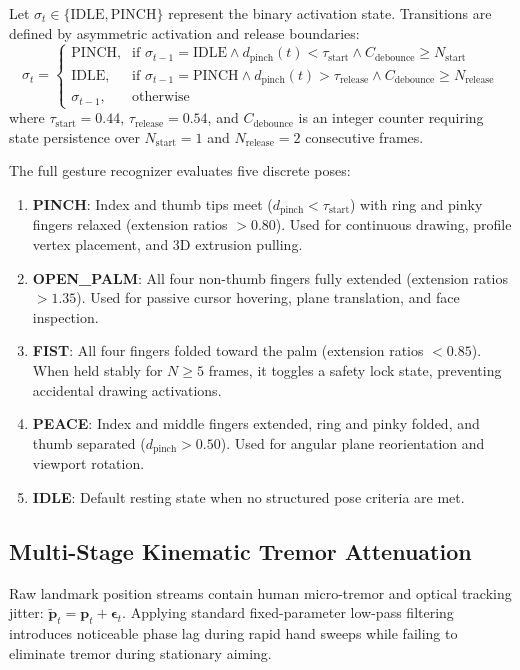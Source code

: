 Let $\sigma_t \in \{\text{IDLE}, \text{PINCH}\}$ represent the binary activation state. Transitions are defined by asymmetric activation and release boundaries:
\begin{equation}
\sigma_t = \begin{cases}
\text{PINCH}, & \text{if } \sigma_{t-1} = \text{IDLE} \land d_{\text{pinch}}(t) < \tau_{\text{start}} \land C_{\text{debounce}} \ge N_{\text{start}} \\
\text{IDLE}, & \text{if } \sigma_{t-1} = \text{PINCH} \land d_{\text{pinch}}(t) > \tau_{\text{release}} \land C_{\text{debounce}} \ge N_{\text{release}} \\
\sigma_{t-1}, & \text{otherwise}
\end{cases}
\label{eq:hysteresis}
\end{equation}
where $\tau_{\text{start}} = 0.44$, $\tau_{\text{release}} = 0.54$, and $C_{\text{debounce}}$ is an integer counter requiring state persistence over $N_{\text{start}} = 1$ and $N_{\text{release}} = 2$ consecutive frames.

The full gesture recognizer evaluates five discrete poses:
\begin{enumerate}
    \item \textbf{PINCH}: Index and thumb tips meet ($d_{\text{pinch}} < \tau_{\text{start}}$) with ring and pinky fingers relaxed (extension ratios $> 0.80$). Used for continuous drawing, profile vertex placement, and 3D extrusion pulling.
    \item \textbf{OPEN\_PALM}: All four non-thumb fingers fully extended (extension ratios $> 1.35$). Used for passive cursor hovering, plane translation, and face inspection.
    \item \textbf{FIST}: All four fingers folded toward the palm (extension ratios $< 0.85$). When held stably for $N \ge 5$ frames, it toggles a safety lock state, preventing accidental drawing activations.
    \item \textbf{PEACE}: Index and middle fingers extended, ring and pinky folded, and thumb separated ($d_{\text{pinch}} > 0.50$). Used for angular plane reorientation and viewport rotation.
    \item \textbf{IDLE}: Default resting state when no structured pose criteria are met.
\end{enumerate}

\subsection{Multi-Stage Kinematic Tremor Attenuation}
Raw landmark position streams contain human micro-tremor and optical tracking jitter: $\tilde{\mathbf{p}}_t = \mathbf{p}_t + \boldsymbol{\epsilon}_t$. Applying standard fixed-parameter low-pass filtering introduces noticeable phase lag during rapid hand sweeps while failing to eliminate tremor during stationary aiming.

